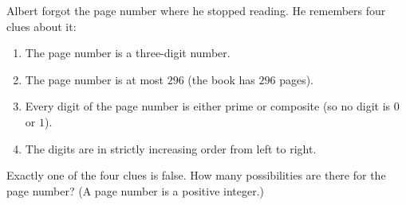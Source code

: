 Albert forgot the page number where he stopped reading. He remembers four clues about it:
\begin{enumerate}
\item The page number is a three-digit number.
\item The page number is at most $296$ (the book has $296$ pages).
\item Every digit of the page number is either prime or composite (so no digit is $0$ or $1$).
\item The digits are in strictly increasing order from left to right.
\end{enumerate}
Exactly one of the four clues is false. How many possibilities are there for the page number? (A page number is a positive integer.)
